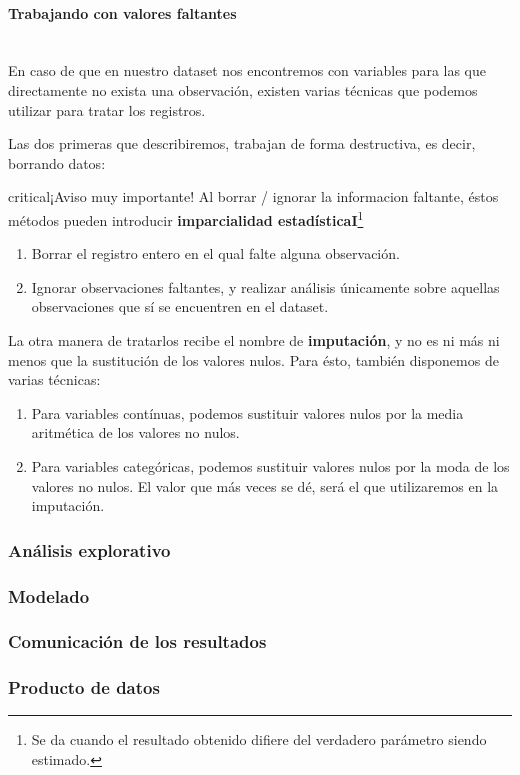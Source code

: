 \paragraph{Trabajando con valores faltantes} \mbox{}\\

En caso de que en nuestro dataset nos encontremos con variables para las que
directamente no exista una observación, existen varias técnicas que podemos
utilizar para tratar los registros.

Las dos primeras que describiremos, trabajan de forma destructiva, es decir,
borrando datos: 

\begin{TMbulletin}{critical}{$¡$Aviso muy importante!}
  Al borrar / ignorar la informacion faltante, éstos métodos pueden
  introducir \textbf{imparcialidad estadísticaI}\footnote{Se da cuando
el resultado obtenido difiere del verdadero parámetro siendo estimado.}
\end{TMbulletin}

\begin{enumerate}
\item Borrar el registro entero en el qual falte alguna observación.
\item Ignorar observaciones faltantes, y realizar análisis únicamente sobre
  aquellas observaciones que sí se encuentren en el dataset.
\end{enumerate}

La otra manera de tratarlos recibe el nombre de \textbf{imputación}, y no es ni
más ni menos que la sustitución de los valores nulos. Para ésto, también
disponemos de varias técnicas:

\begin{enumerate}
\item Para variables contínuas, podemos sustituir valores nulos por la media
  aritmética de los valores no nulos.
\item Para variables categóricas, podemos sustituir valores nulos por la moda de
  los valores no nulos. El valor que más veces se dé, será el que utilizaremos
  en la imputación.
\end{enumerate}




\subsubsection{Análisis explorativo}
\label{subsec:state_dataScience_workflow_2}

\subsubsection{Modelado}
\label{subsec:state_dataScience_workflow_modeling}

\subsubsection{Comunicación de los resultados}
\label{subsec:state_dataScience_workflow_communication}

\subsubsection{Producto de datos}
\label{subsec:state_dataScience_workflow_dataProduct}





